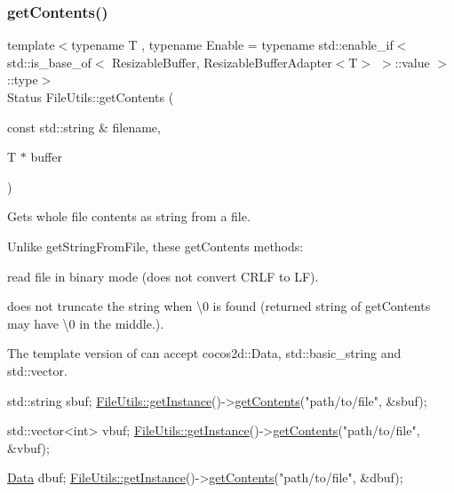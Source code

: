 \subsubsection{\texorpdfstring{get\+Contents()}{getContents()}\hspace{0.1cm}{\footnotesize\ttfamily [1/2]}}
{\footnotesize\ttfamily template$<$typename T , typename Enable  = typename std\+::enable\+\_\+if$<$            std\+::is\+\_\+base\+\_\+of$<$ Resizable\+Buffer, Resizable\+Buffer\+Adapter$<$\+T$>$ $>$\+::value        $>$\+::type$>$ \\
Status File\+Utils\+::get\+Contents (\begin{DoxyParamCaption}\item[{const std\+::string \&}]{filename,  }\item[{T $\ast$}]{buffer }\end{DoxyParamCaption})\hspace{0.3cm}{\ttfamily [inline]}}

Gets whole file contents as string from a file.

Unlike get\+String\+From\+File, these get\+Contents methods\+:
\begin{DoxyItemize}
\item read file in binary mode (does not convert C\+R\+LF to LF).
\item does not truncate the string when \textquotesingle{}\textbackslash{}0\textquotesingle{} is found (returned string of get\+Contents may have \textquotesingle{}\textbackslash{}0\textquotesingle{} in the middle.).
\end{DoxyItemize}

The template version of can accept cocos2d\+::\+Data, std\+::basic\+\_\+string and std\+::vector.


\begin{DoxyCode}
std::string sbuf;
\hyperlink{classFileUtils_ac8ced4394d59f5459445ced27ccd0e8a}{FileUtils::getInstance}()->\hyperlink{classFileUtils_a4e9cd9c1ab62bf30f42a423df06016b8}{getContents}(\textcolor{stringliteral}{"path/to/file"}, &sbuf);

std::vector<int> vbuf;
\hyperlink{classFileUtils_ac8ced4394d59f5459445ced27ccd0e8a}{FileUtils::getInstance}()->\hyperlink{classFileUtils_a4e9cd9c1ab62bf30f42a423df06016b8}{getContents}(\textcolor{stringliteral}{"path/to/file"}, &vbuf);

\hyperlink{classData}{Data} dbuf;
\hyperlink{classFileUtils_ac8ced4394d59f5459445ced27ccd0e8a}{FileUtils::getInstance}()->\hyperlink{classFileUtils_a4e9cd9c1ab62bf30f42a423df06016b8}{getContents}(\textcolor{stringliteral}{"path/to/file"}, &dbuf);
\end{DoxyCode}


